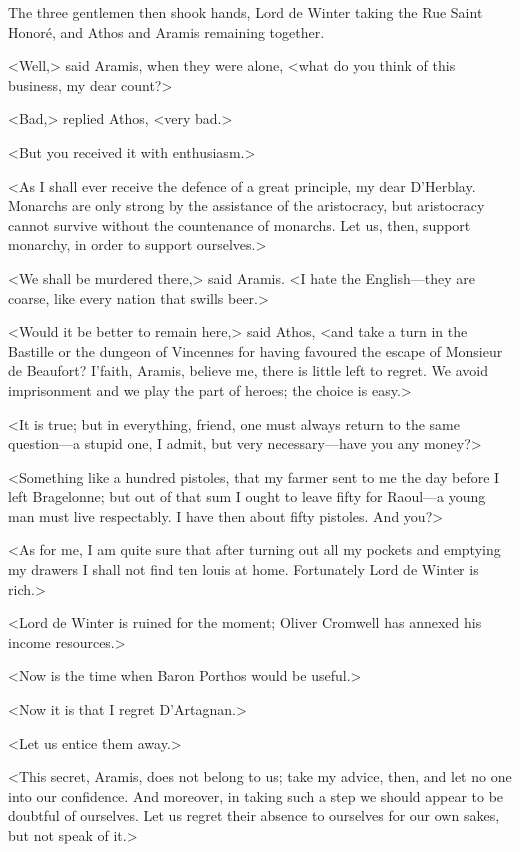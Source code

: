 The three gentlemen then shook hands, Lord de Winter taking the Rue Saint Honoré, and Athos and Aramis remaining together.

<Well,> said Aramis, when they were alone, <what do you think of this business, my dear count?>

<Bad,> replied Athos, <very bad.>

<But you received it with enthusiasm.>

<As I shall ever receive the defence of a great principle, my dear D'Herblay. Monarchs are only strong by the assistance of the aristocracy, but aristocracy cannot survive without the countenance of monarchs. Let us, then, support monarchy, in order to support ourselves.>

<We shall be murdered there,> said Aramis. <I hate the English—they are coarse, like every nation that swills beer.>

<Would it be better to remain here,> said Athos, <and take a turn in the Bastille or the dungeon of Vincennes for having favoured the escape of Monsieur de Beaufort? I'faith, Aramis, believe me, there is little left to regret. We avoid imprisonment and we play the part of heroes; the choice is easy.>

<It is true; but in everything, friend, one must always return to the same question—a stupid one, I admit, but very necessary—have you any money?>

<Something like a hundred pistoles, that my farmer sent to me the day before I left Bragelonne; but out of that sum I ought to leave fifty for Raoul—a young man must live respectably. I have then about fifty pistoles. And you?>

<As for me, I am quite sure that after turning out all my pockets and emptying my drawers I shall not find ten louis at home. Fortunately Lord de Winter is rich.>

<Lord de Winter is ruined for the moment; Oliver Cromwell has annexed his income resources.>

<Now is the time when Baron Porthos would be useful.>

<Now it is that I regret D'Artagnan.>

<Let us entice them away.>

<This secret, Aramis, does not belong to us; take my advice, then, and let no one into our confidence. And moreover, in taking such a step we should appear to be doubtful of ourselves. Let us regret their absence to ourselves for our own sakes, but not speak of it.>

